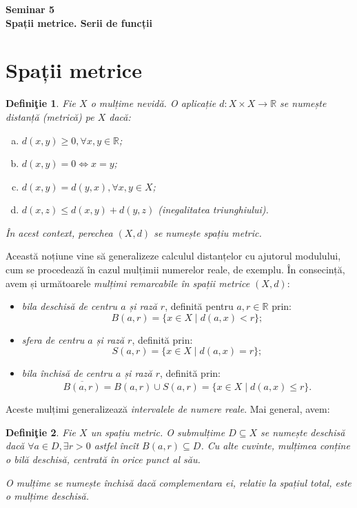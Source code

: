 \documentclass[11pt,a4paper]{article}
\newcommand\seq{\subseteq}
\newcommand\RR{\mathbb{R}}
\theoremstyle{dotless}
\theoremstyle{dotlessdr}
\newtheorem{definition}{Defini\c{t}ie}[section]
\begin{document}

\begin{center}
  {\large\textbf{Seminar 5 \\ Spații metrice. Serii de funcții}}
\end{center}

\section{Spații metrice}
\label{sec:sp-metrice}

\begin{definition}\label{def:distanta}
  Fie $X$ o mulțime nevidă. O aplicație $d : X \times X \to \RR$ se numește \emph{distanță}
  (metrică) pe $X$ dacă:
  \begin{enumerate}[(a)]
  \item $d(x, y) \geq 0, \forall x, y \in \RR$;
  \item $d(x, y) = 0 \Leftrightarrow x = y$;
  \item $d(x, y) = d(y, x), \forall x, y \in X$;
  \item $d(x, z) \leq d(x, y) + d(y, z)$ (\emph{inegalitatea triunghiului}).
  \end{enumerate}

  În acest context, perechea $(X, d)$ se numește \emph{spațiu metric}.
\end{definition}

Această noțiune vine să generalizeze calculul distanțelor cu ajutorul modulului,
cum se procedează în cazul mulțimii numerelor reale, de exemplu. În consecință,
avem și următoarele \emph{mulțimi remarcabile în spații metrice $(X, d)$}:
\begin{itemize}
\item \emph{bila deschisă de centru $a$ și rază $r$}, definită pentru $a, r \in \RR$ prin:
  \[
    B(a, r) = \{ x \in X \mid d(a, x) < r \};
  \]
\item \emph{sfera de centru $a$ și rază $r$}, definită prin:
  \[
    S(a, r) = \{ x \in X \mid d(a, x) = r \};
  \]
\item \emph{bila închisă de centru $a$ și rază $r$}, definită prin:
  \[
    \overline{B(a, r)} = B(a, r) \cup S(a, r) = \{x \in X \mid d(a, x) \leq r \}.
  \]
\end{itemize}

Aceste mulțimi generalizează \emph{intervalele de numere reale}. Mai general, avem:
\begin{definition}\label{def:m-deschisa}
  Fie $X$ un spațiu metric. O submulțime $D \seq X$ se numește \emph{deschisă} dacă
  $\forall a \in D, \exists r > 0$ astfel încît $B(a, r) \seq D$. Cu alte cuvinte,
  mulțimea conține o bilă deschisă, centrată în orice punct al său.

  O mulțime se numește \emph{închisă} dacă complementara ei, relativ la spațiul total,
  este o mulțime deschisă.
\end{definition}
\end{document}
